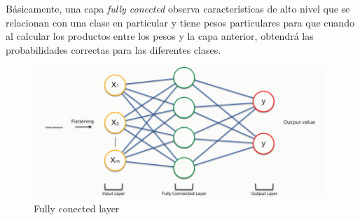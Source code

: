 Básicamente, una capa \textit{fully conected} observa características de alto nivel que se relacionan con una clase en particular y tiene pesos particulares para que cuando al calcular los productos entre los pesos y la capa anterior, obtendrá las probabilidades correctas para las diferentes clases.

\begin{figure}[H]
 \centering
  \includegraphics[height=5cm,keepaspectratio=true,clip=true]{imagenes/MarcoTeorico/fully_conected.png}
  \caption{Fully conected layer} \label{Fig:fully_conected}
\end{figure}



